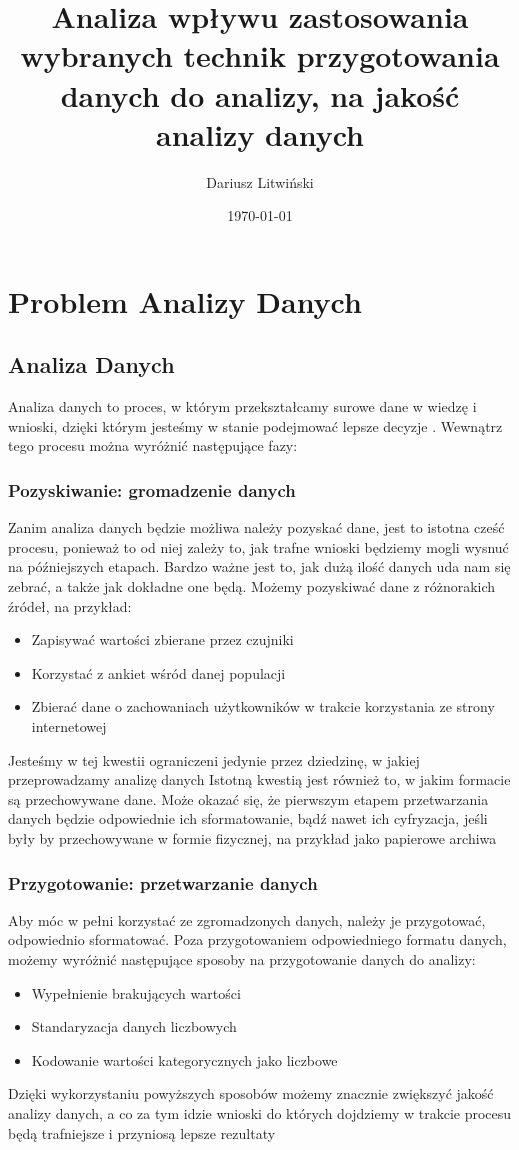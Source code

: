 \documentclass{book}
\title{Analiza wpływu zastosowania wybranych technik przygotowania danych do analizy, na jakość analizy danych}
\author{Dariusz Litwiński}
\date{\today}
\begin{document}
\maketitle
\chapter{Problem Analizy Danych}

\section{Analiza Danych}
Analiza danych to proces, 
w którym przekształcamy surowe dane w wiedzę i 
wnioski, dzięki którym jesteśmy w stanie podejmować lepsze decyzje \cite{data_analysis}. 
Wewnątrz tego procesu można wyróżnić następujące fazy:

\subsection{Pozyskiwanie: gromadzenie danych}
Zanim analiza danych będzie możliwa należy pozyskać dane, 
jest to istotna cześć procesu, ponieważ to od niej zależy to, 
jak trafne wnioski będziemy mogli wysnuć na późniejszych etapach.
Bardzo ważne jest to, jak dużą ilość danych uda nam się zebrać, a także jak dokładne one będą.
Możemy pozyskiwać dane z różnorakich źródeł, na przykład: 
\begin{itemize}
    \item Zapisywać wartości zbierane przez czujniki 
    \item Korzystać z ankiet wśród danej populacji
    \item Zbierać dane o zachowaniach użytkowników w trakcie korzystania ze strony internetowej
  \end{itemize}
Jesteśmy w tej kwestii ograniczeni jedynie przez dziedzinę, w jakiej przeprowadzamy analizę danych
Istotną kwestią jest również to, w jakim formacie są 
przechowywane dane. Może okazać się, że pierwszym etapem przetwarzania danych 
będzie odpowiednie ich sformatowanie, bądź nawet ich cyfryzacja, jeśli były 
by przechowywane w formie fizycznej, na przykład jako papierowe archiwa


\subsection{Przygotowanie: przetwarzanie danych}
Aby móc w pełni korzystać ze zgromadzonych danych, 
należy je przygotować, odpowiednio sformatować. 
Poza przygotowaniem odpowiedniego formatu danych, 
możemy wyróżnić następujące sposoby na przygotowanie danych do analizy:
\begin{itemize}
    \item Wypełnienie brakujących wartości 
    \item Standaryzacja danych liczbowych
    \item Kodowanie wartości kategorycznych jako liczbowe
  \end{itemize}
Dzięki wykorzystaniu powyższych sposobów możemy znacznie zwiększyć jakość analizy danych, 
a co za tym idzie wnioski do których dojdziemy w trakcie procesu będą 
trafniejsze i przyniosą lepsze rezultaty
\end{document}
